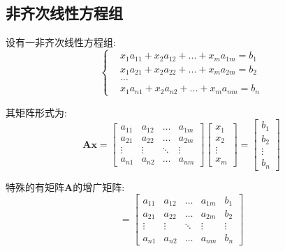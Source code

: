 \subsection{非齐次线性方程组}
设有一非齐次线性方程组:
\begin{equation*}
\left\{\begin{aligned}
       & x_{1}a_{11}+x_{2}a_{12}+...+x_{m}a_{1m}=b_{1} \\
       & x_{1}a_{21}+x_{2}a_{22}+...+x_{m}a_{2m}=b_{2} \\
       & \dots \\
       & x_{1}a_{n1}+x_{2}a_{n2}+...+x_{m}a_{nm}=b_{n}
\end{aligned}
\right.
\end{equation*}\par
其矩阵形式为:
\begin{equation*}
\bm{A}\bm{x}=\begin{bmatrix}
             a_{11} & a_{12} & \dots & a_{1m} \\
             a_{21} & a_{22} & \dots & a_{2m} \\
             \vdots & \vdots & \ddots & \vdots \\
             a_{n1} & a_{n2} & \dots & a_{nm}
\end{bmatrix}
\begin{bmatrix}
x_{1} \\
x_{2} \\
\vdots \\
x_{m}
\end{bmatrix}=
\begin{bmatrix}
b_{1} \\
b_{2} \\
\vdots \\
b_{n}
\end{bmatrix}
\end{equation*}\par
特殊的有矩阵$ \bm{A} $的增广矩阵:
\begin{equation*}
[\bm{A},\bm{b}]=\begin{bmatrix}
                a_{11} & a_{12} & \dots & a_{1m} & b_{1} \\
                a_{21} & a_{22} & \dots & a_{2m} & b_{2} \\
                \vdots & \vdots & \ddots & \vdots & \vdots \\
                a_{n1} & a_{n2} & \dots & a_{nm} & b_{n}
\end{bmatrix}
\end{equation*}
